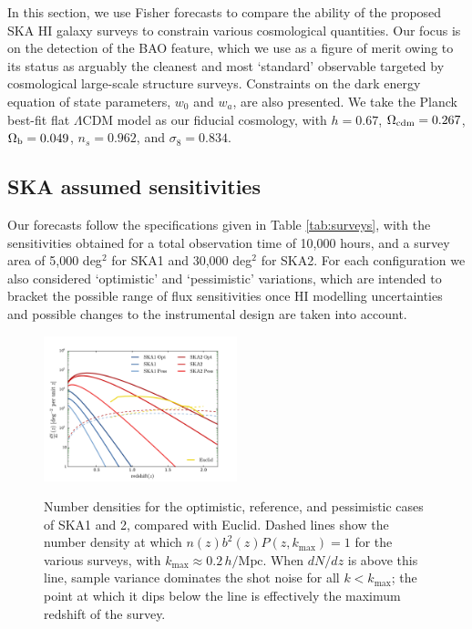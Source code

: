 \documentclass[useAMS,usenatbib]{mn2e}
\begin{document}
In this section, we use Fisher forecasts to compare the ability of the proposed SKA HI galaxy surveys to constrain various cosmological quantities. Our focus is on the detection of the BAO feature, which we use as a figure of merit owing to its status as arguably the cleanest \citep{2010ApJ...720.1650S, 2011ApJ...734...94M} and most `standard' observable targeted by cosmological large-scale structure surveys. Constraints on the dark energy equation of state parameters, $w_0$ and $w_a$, are also presented. We take the Planck best-fit flat $\Lambda$CDM model \citep{Ade:2013zuv} as our fiducial cosmology, with 
$h=0.67$, $\Omega_{{\rm cdm}} = 0.267$, $\Omega_{\rm b}= 0.049$, $n_s=0.962$, and $\sigma_8=0.834$. \vspace{-1em}



\subsection{SKA assumed sensitivities}


Our forecasts follow the specifications given in Table \ref{tab:surveys}, with the sensitivities obtained for a total observation time of 10,000 hours, and a survey area of 5,000 deg$^2$ for SKA1 and 30,000 deg$^2$ for SKA2. For each configuration we also considered `optimistic' and `pessimistic' variations, which are intended to bracket the possible range of flux sensitivities once HI modelling uncertainties and possible changes to the instrumental design are taken into account.

\begin{figure}
\begin{center}
\vspace{-1em}
\includegraphics[width=0.5\textwidth]{plots/cosmic_Variance_2.pdf}
\caption{Number densities for the optimistic, reference, and pessimistic cases of SKA1 and 2, compared with Euclid. Dashed lines show the number density at which $n(z) b^2(z) P(z, k_\mathrm{max}) = 1$ for the various surveys, with $k_\mathrm{max} \approx 0.2 \,h /\mathrm{Mpc}$. When $dN/dz$ is above this line, sample variance dominates the shot noise for all $k < k_\mathrm{max}$; the point at which it dips below the line is effectively the maximum redshift of the survey.}\vspace{-2em}
\label{fig:cosmic_variance}
\end{center}
\end{figure}
\end{document}
